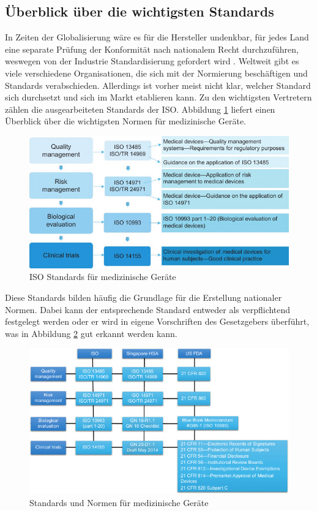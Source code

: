 \documentclass[a4paper,12pt]{report}
\begin{document}
\subsection{Überblick über die wichtigsten Standards}\label{subsec:UeberblickStandard}
In Zeiten der Globalisierung wäre es für die Hersteller undenkbar, für jedes Land eine separate Prüfung der Konformität nach nationalem Recht durchzuführen, weswegen von der Industrie Standardisierung gefordert wird \citep[vgl.][S. 6]{Higson2002}. Weltweit gibt es viele verschiedene Organisationen, die sich mit der Normierung beschäftigen und Standards verabschieden. Allerdings ist vorher meist nicht klar, welcher Standard sich durchsetzt und sich im Markt etablieren kann. Zu den wichtigsten Vertretern zählen die ausgearbeiteten Standards der \ac{ISO}. Abbildung \ref{iso_standards} liefert einen Überblick über die wichtigsten Normen für medizinische Geräte.
\begin{figure}[ht]
\centering
\includegraphics[width=1\textwidth]{Images/iso_standards}
\caption[ISO Standards für medizinische Geräte]{ISO Standards für medizinische Geräte \citep[S. 16]{Ramakrishna2015}}
\label{iso_standards}
\end{figure}
Diese Standards bilden häufig die Grundlage für die Erstellung nationaler Normen. Dabei kann der entsprechende Standard entweder als verpflichtend festgelegt werden oder er wird in eigene Vorschriften des Gesetzgebers überführt, was in Abbildung \ref{iso_standards_adaption} gut erkannt werden kann.
\begin{figure}[ht]
\centering
\includegraphics[width=1\textwidth]{Images/iso_standards_adaption}
\caption[Standards und Normen für medizinische Geräte]{Standards und Normen für medizinische Geräte \citep[S. 16]{Ramakrishna2015}}
\label{iso_standards_adaption}
\end{figure}
\end{document}

